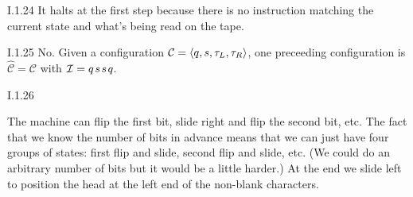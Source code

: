 %
\begin{ans}{I.1.24}
It halts at the first step because there is no instruction matching
the current state and what's being read on the tape.
\end{ans}
%
\begin{ans}{I.1.25}
No.
Given a configuration $\mathcal{C}=\langle q,s,\tau_L,\tau_R\rangle$,
one preceeding configuration is $\hat{\mathcal{C}}=\mathcal{C}$
with $\mathcal{I}=q\mskip2mu s\mskip2mu s\mskip2mu q$.
\end{ans}
%
\begin{ans}{I.1.26}
\begin{exparts}
\item The machine can flip the first bit, slide right and flip the second
bit, etc.
The fact that we know the number of bits in advance means that we can
just have four groups of states: first flip and slide, second flip and slide,
etc.
(We could do an arbitrary number of bits but it would be a little harder.)
At the end we slide left to position the head at the left end of the
non-blank characters.


\end{exparts}
\end{ans}
